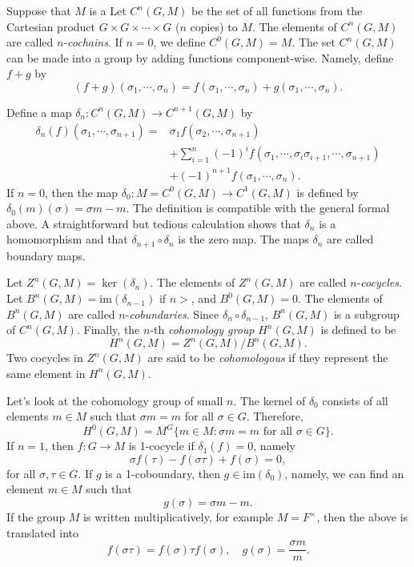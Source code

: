 \documentclass[12pt]{report}
\theoremstyle{definition}
\newcommand{\im}{\text{im}}
\begin{document}
Suppose that $M$ is a Let $C^n(G,M)$ be the set of all functions from the Cartesian product $G\times G\times\cdots\times G$ ($n$ copies) to $M$. The elements of $C^n(G,M)$ are called $n$-\emph{cochains}. If $n=0$, we define $C^0(G,M)=M$. The set $C^n(G,M)$ can be made into a group by adding functions component-wise. Namely, define $f+g$  by $$(f+g)(\sigma_1,\cdots,\sigma_n)=f(\sigma_1,\cdots,\sigma_n)+g(\sigma_1,\cdots,\sigma_n).$$

Define a map $\delta_n: C^n(G,M)\to C^{n+1}(G,M)$ by \begin{align*}
	\delta_n(f)(\sigma_1,\cdots,\sigma_{n+1})= & \sigma_1f(\sigma_2,\cdots,\sigma_{n+1})                                        \\
	                                           & +\sum_{i=1}^n(-1)^if(\sigma_1,\cdots,\sigma_i\sigma_{i+1},\cdots,\sigma_{n+1}) \\
	                                           & + (-1)^{n+1} f(\sigma_1,\cdots,\sigma_n).
\end{align*}
If $n=0$, then the map $\delta_0: M=C^0(G,M)\to C^1(G,M)$ is defined by $\delta_0(m)(\sigma)=\sigma m-m$. The definition is compatible with the general formal above. A straightforward but tedious calculation shows that $\delta_n$ is a homomorphism and that $\delta_{n+1}\circ\delta_n$ is the zero map. The maps $\delta_n$ are called boundary maps.


Let $Z^n(G,M)=\ker(\delta_n)$. The elements of $Z^n(G,M)$ are called $n$-\emph{cocycles}. Let $B^n(G,M)=\im(\delta_{n-1})$ if $n>$, and $B^0(G,M)=0$. The elements of $B^n(G,M)$ are called $n$-\emph{cobundaries}. Since $\delta_n\circ\delta_{n-1}$, $B^n(G,M)$ is a subgroup of $C^n(G,M)$. Finally, the $n$-th \emph{cohomology group} $H^n(G,M)$ is defined to be $$H^n(G,M)=Z^n(G,M)/B^n(G,M).$$ Two cocycles in $Z^n(G,M)$ are said to be \emph{cohomologous} if they represent the same element in $H^n(G,M)$.

Let's look at the cohomology group of small $n$. The kernel of $\delta_0$ consists of all elements $m\in M$ such that $\sigma m=m$ for all $\sigma\in G$. Therefore, $$H^0(G,M)=M^G\{m\in M: \sigma m =m \mbox{ for all }\sigma\in G\}.$$
If $n=1$, then $f:G\to M$ is 1-cocycle if $\delta_1(f)=0$, namely $$\sigma f(\tau)-f(\sigma\tau)+f(\sigma)=0,$$ for all $\sigma,\tau \in G$. If $g$ is a 1-coboundary, then $g\in \im(\delta_0)$, namely, we can find an element $m\in M$ such that $$g(\sigma)=\sigma m -m.$$ If the group $M$ is written multiplicatively, for example $M= F^\times$, then the above is translated into $$f(\sigma\tau)=f(\sigma)\tau f(\sigma),\quad g(\sigma)=\frac{\sigma m}{m}.$$
\end{document}
